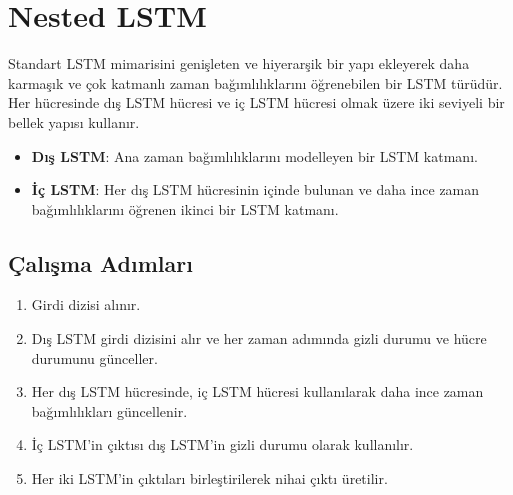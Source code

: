 \section{Nested LSTM}
Standart LSTM mimarisini genişleten ve hiyerarşik bir yapı ekleyerek daha karmaşık ve çok katmanlı zaman bağımlılıklarını öğrenebilen bir LSTM türüdür.  Her hücresinde dış LSTM hücresi ve iç LSTM hücresi olmak üzere iki seviyeli bir bellek yapısı kullanır.

\begin{itemize}
	\item \textbf{Dış LSTM}: Ana zaman bağımlılıklarını modelleyen bir LSTM katmanı.
	\item \textbf{İç LSTM}: Her dış LSTM hücresinin içinde bulunan ve daha ince zaman bağımlılıklarını öğrenen ikinci bir LSTM katmanı.
\end{itemize}

\subsection{Çalışma Adımları}

\begin{enumerate}
	\item Girdi dizisi alınır.
	\item Dış LSTM girdi dizisini alır ve her zaman adımında gizli durumu ve hücre durumunu günceller.
	\item Her dış LSTM hücresinde, iç LSTM hücresi kullanılarak daha ince zaman bağımlılıkları güncellenir.
	\item İç LSTM'in çıktısı dış LSTM'in gizli durumu olarak kullanılır.
	\item Her iki LSTM'in çıktıları birleştirilerek nihai çıktı üretilir.
\end{enumerate}

\newpage

